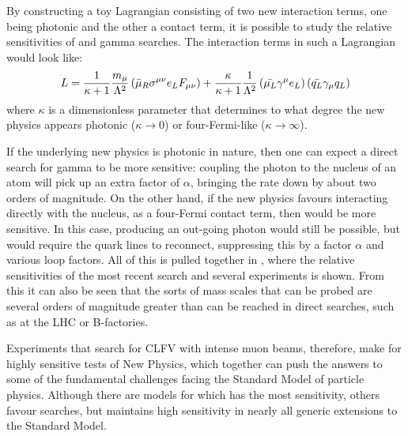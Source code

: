 By constructing a toy Lagrangian consisting of two new interaction terms, one being photonic and the other a contact term, it is possible to study the relative sensitivities of \mueconv and \mutoe gamma searches.
The interaction terms in such a Lagrangian would look like:
\begin{equation}
L=\frac{1}{\kappa+1}\frac{m_\mu}{\Lambda^2}\left(\bar{\mu}_R\sigma^{\mu\nu}e_LF_{\mu\nu}\right)+\frac{\kappa}{\kappa+1}\frac{1}{\Lambda^2}\left(\bar{\mu_L}\gamma^\mu e_L\right)\left(\bar{q_L}\gamma_\mu q_L\right)
\eqlabel{theory:toy}
\end{equation}
where $\kappa$ is a dimensionless parameter that determines to what degree the new physics appears photonic ($\kappa\rightarrow0$) or four-Fermi-like ($\kappa\rightarrow\infty$).
\FigTheoryMuecVsMueg

If the underlying new physics is photonic in nature, then one can expect a direct search for \mutoe gamma to be more sensitive: coupling the photon to the nucleus of an atom will pick up an extra factor of $\alpha$, bringing the rate down by about two orders of magnitude.
On the other hand, if the new physics favours interacting directly with the nucleus, as a four-Fermi contact term, then \mueconv would be more sensitive. 
In this case, producing an out-going photon would still be possible, but would require the quark lines to reconnect, suppressing this by a factor $\alpha$ and various loop factors.
All of this is pulled together in , where the relative sensitivities of the most recent \muegamma search and several \mueconv experiments is shown.
From this it can also be seen that the sorts of mass scales that can be probed are several orders of magnitude greater than can be reached in direct searches, such as at the LHC or B-factories.

Experiments that search for \ac{CLFV} with intense muon beams, therefore, make for highly sensitive tests of New Physics, which together can push the answers to some of the fundamental challenges facing the Standard Model of particle physics.
Although there are models for which \mueconv has the most sensitivity, others favour \muegamma searches, but \mueconv maintains high sensitivity in nearly all generic extensions to the Standard Model.
